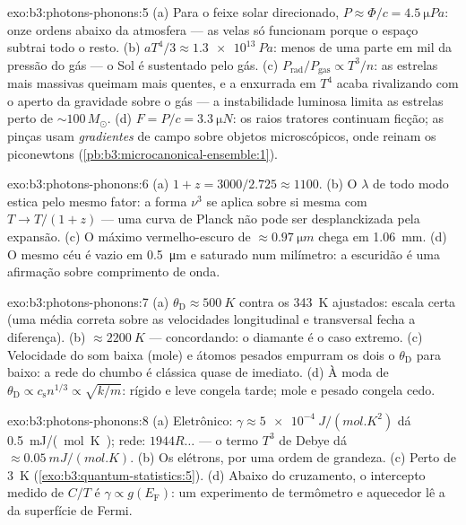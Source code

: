 \begin{solution}{exo:b3:photons-phonons:5}
(a) Para o feixe solar direcionado, $P \approx \Phi/c =
\qty{4.5}{\micro Pa}$: onze ordens abaixo da atmosfera ---
as velas só funcionam porque o espaço subtrai todo o resto. (b)
$aT^4/3 \approx \qty{1.3e13}{Pa}$: menos de uma parte em
mil da pressão do gás --- o Sol é sustentado pelo gás. (c)
$P_{\text{rad}}/P_{\text{gas}} \propto T^3/n$: as estrelas mais
massivas queimam mais quentes, e a enxurrada em $T^4$ acaba
rivalizando com o aperto da gravidade sobre o gás --- a instabilidade
luminosa limita as estrelas perto de
$\sim100\,M_\odot$. (d) $F = P/c = \qty{3.3}{\micro N}$:
os raios tratores continuam ficção; as pinças usam \emph{gradientes} de
campo sobre objetos microscópicos, onde reinam os piconewtons
(\cref{pb:b3:microcanonical-ensemble:1}).
\end{solution}

\begin{solution}{exo:b3:photons-phonons:6}
(a) $1 + z = 3000/2.725 \approx 1100$. (b) O $\lambda$ de todo modo
estica pelo mesmo fator: a forma $\nu^3$ se aplica sobre si mesma
com $T \to T/(1+z)$ --- uma curva de Planck não pode ser
desplanckizada pela expansão. (c) O máximo vermelho-escuro de
$\approx\qty{0.97}{\micro m}$ chega em \qty{1.06}{mm}. (d) O mesmo céu
é vazio em \qty{0.5}{\micro m} e saturado num milímetro: a escuridão é
uma afirmação sobre comprimento de onda.
\end{solution}

\begin{solution}{exo:b3:photons-phonons:7}
(a) $\theta_{\text{D}} \approx \qty{500}{K}$ contra os
\qty{343}{K} ajustados: escala certa (uma média correta sobre as
velocidades longitudinal e transversal fecha a diferença). (b)
$\approx\qty{2200}{K}$ --- concordando: o diamante é o caso extremo.
(c) Velocidade do som baixa (mole) e átomos pesados empurram os dois o
$\theta_{\text{D}}$ para baixo: a rede do chumbo
é clássica quase de imediato. (d) À moda de $\theta_{\text{D}} \propto
c_{\text{s}}n^{1/3} \propto \sqrt{k/m}$: rígido e leve
congela tarde; mole e pesado congela cedo.
\end{solution}

\begin{solution}{exo:b3:photons-phonons:8}
(a) Eletrônico: $\gamma \approx \qty{5e-4}{J/(mol.K^2)}$ dá
\qty{0.5}{mJ/(mol.K)}; rede: $1944R\dots$ --- o termo $T^3$ de Debye
dá $\approx\qty{0.05}{mJ/(mol.K)}$. (b) Os elétrons, por uma
ordem de grandeza. (c) Perto de \qty{3}{K}
(\cref{exo:b3:quantum-statistics:5}). (d) Abaixo do cruzamento, o
intercepto medido de $C/T$ é $\gamma \propto g(E_{\text{F}})$: um
experimento de termômetro e aquecedor lê a 
da superfície de Fermi.
\end{solution}


